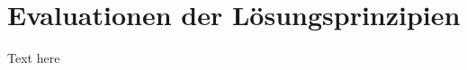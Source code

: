 \documentclass[main.tex]{subfiles} %
\begin{document}

\section{Evaluationen der Lösungsprinzipien}

Text here
\end{document}
